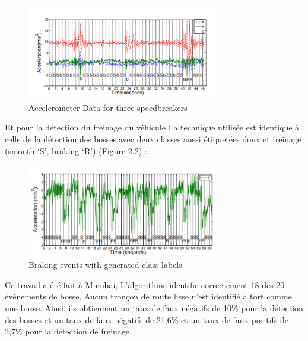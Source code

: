 \begin{figure}[h!]
  \center
  \includegraphics[width=0.75\textwidth]{Images/chapter2/relatedWork1.PNG}
 \caption{Accelerometer Data for three speedbreakers}
 \label{fig:graph}
  \end{figure}
  Et pour la détection du freinage du véhicule La technique utilisée est identique à celle de la détection des bosses,avec deux classes aussi étiquetées doux et freinage (smooth ‘S’, braking ‘R’) (Figure 2.2) :\newline
  \begin{figure}[h!]
    \center
    \includegraphics[width=0.75\textwidth]{Images/chapter2/relatedWork2.PNG}
   \caption{Braking events with generated class labels}
   \label{fig:graph}
    \end{figure}
    Ce  travail a été fait à Mumbai, L'algorithme identifie correctement 18 des 20 événements de bosse, Aucun tronçon de route lisse n'est identifié à tort comme une bosse. Ainsi, ils obtiennent un taux de faux négatifs de 10\% pour la détection des bosses et un taux de faux négatifs de 21,6\% et un taux de faux positifs de 2,7\% pour la détection de freinage.

